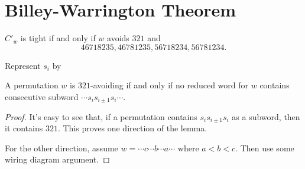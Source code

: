 \section{Billey-Warrington Theorem}
\begin{theorem}
$C'_w$ is tight if and only if $w$ avoids $321$ and
	\[46718235,46781235,56718234,56781234.\]
\end{theorem}


\begin{definition}[Heap]
	Represent $s_i$ by 
\end{definition}

\begin{lemma}[BJS]
	A permutation $w$ is $321$-avoiding if and only if no reduced word for $w$ contains consecutive subword $\cdots s_is_{i\pm 1}s_i\cdots$.
\end{lemma}
\begin{proof}
	It's easy to see that, if a permutation contains $s_is_{i\pm 1}s_i$ as a subword, then it contains $321$. This proves one direction of the lemma.
	
	For the other direction, assume $w=\cdots c\cdots b\cdots a\cdots$ where $a<b<c$. Then use some wiring diagram argument.
\end{proof}
